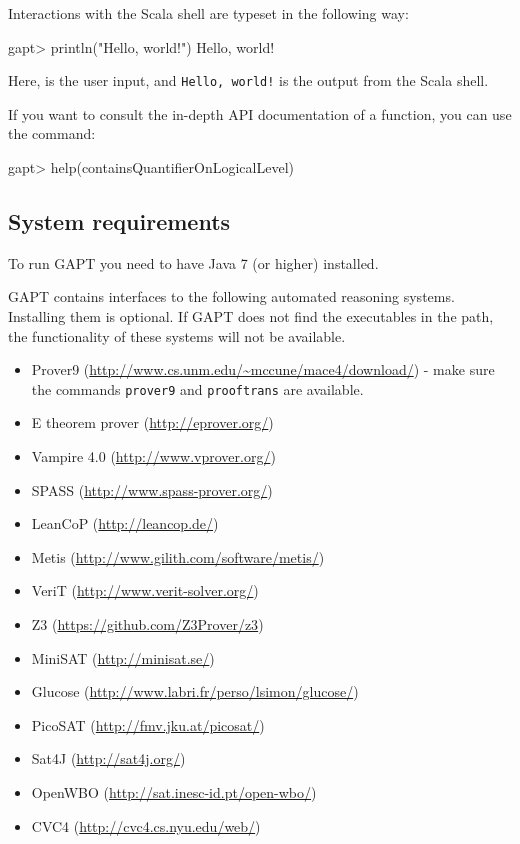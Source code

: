 \documentclass[a4paper,11pt]{article}
\newcommand{\cli}[1]{{\ttfamily {#1}}}
\begin{document}
Interactions with the Scala shell are typeset in the following way:
\begin{clilisting}
gapt> println("Hello, world!")
Hello, world!

\end{clilisting}
Here, {\bfseries \cli{println("Hello, world!")}} is the user input, and \texttt{Hello,
world!} is the output from the Scala shell.

If you want to consult the in-depth API documentation of a function, you can
use the \cli{help} command:
\begin{clilisting}
gapt> help(containsQuantifierOnLogicalLevel)

\end{clilisting}

\subsection{System requirements}
\label{sec:sysreq}

To run GAPT you need to have Java 7 (or higher) installed.

GAPT contains interfaces to the following automated reasoning systems. Installing
them is optional. If GAPT does not find the executables in the path, the
functionality of these systems will not be available.

\begin{itemize}
\item Prover9 (\url{http://www.cs.unm.edu/~mccune/mace4/download/}) - make sure
  the commands \texttt{prover9} and \texttt{prooftrans} are available.
\item E theorem prover (\url{http://eprover.org/})
\item Vampire 4.0 (\url{http://www.vprover.org/})
\item SPASS (\url{http://www.spass-prover.org/})
\item LeanCoP (\url{http://leancop.de/})
\item Metis (\url{http://www.gilith.com/software/metis/})
\item VeriT (\url{http://www.verit-solver.org/})
\item Z3 (\url{https://github.com/Z3Prover/z3})
\item MiniSAT (\url{http://minisat.se/})
\item Glucose (\url{http://www.labri.fr/perso/lsimon/glucose/})
\item PicoSAT (\url{http://fmv.jku.at/picosat/})
\item Sat4J (\url{http://sat4j.org/})
\item OpenWBO (\url{http://sat.inesc-id.pt/open-wbo/})
\item CVC4 (\url{http://cvc4.cs.nyu.edu/web/})
\end{itemize}
\end{document}
